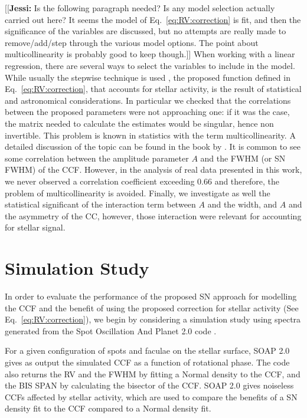 \documentclass{aa}
\newcommand{\jessi}[1]{{\color{Purple}[[\textbf{Jessi: }#1]]}}
\begin{document}
\jessi{Is the following paragraph needed?  Is any model selection actually carried out here?  It seems the model of Eq.~\ref{eq:RV:correction} is fit, and then the significance of the variables are discussed, but no attempts are really made to remove/add/step through the various model options.  The point about multicollinearity is probably good to keep though.} 
When working with a linear regression, there are several ways to select the variables to include in the model. While usually the stepwise technique is used \citep{efroymson1960multiple,hocking1976biometrics}, the proposed function defined in Eq.~\ref{eq:RV:correction}, that accounts for stellar activity, is the result of statistical and astronomical considerations. In particular we checked that the correlations between the proposed parameters were not approaching one: if it was the case, the matrix needed to calculate the estimates would be singular, hence non invertible. This problem is known in statistics with the term multicollinearity. A detailed discussion of the topic can be found in the book by \citet{belsley1991}. It is common to see some correlation between the amplitude parameter $A$ and the FWHM (or SN FWHM) of the CCF. However, in the analysis of real data presented in this work, we never observed a correlation coefficient exceeding $0.66$ and therefore, the problem of multicollinearity is avoided. Finally, we investigate as well the statistical significant of the interaction term between $A$ and the width, and $A$ and the asymmetry of the CC, however, those interaction were relevant for accounting for stellar signal.

\section{Simulation Study} \label{sec:soap}
In order to evaluate the performance of the proposed SN approach for modelling the CCF and the benefit of using the proposed correction for stellar activity (See Eq.~\ref{eq:RV:correction}), we begin by considering a simulation study using spectra generated from the Spot Oscillation And Planet 2.0 code \citep[SOAP 2.0,][]{Dumusque-2014b}.

For a given configuration of spots and faculae on the stellar surface, SOAP 2.0 gives as output the simulated CCF as a function of rotational phase. The code also returns the RV and the FWHM by fitting a Normal density to the CCF, and the BIS SPAN by calculating the bisector of the CCF. SOAP 2.0 gives noiseless CCFs affected by stellar activity, which are used to compare the benefits of a SN density fit to the CCF compared to a Normal density fit.
\end{document}
